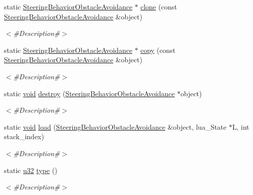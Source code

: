 \begin{DoxyCompactItemize}
static \mbox{\hyperlink{classnjli_1_1_steering_behavior_obstacle_avoidance}{Steering\+Behavior\+Obstacle\+Avoidance}} $\ast$ \mbox{\hyperlink{classnjli_1_1_steering_behavior_obstacle_avoidance_a6318f5b60c6217c7f40555436f452ffd}{clone}} (const \mbox{\hyperlink{classnjli_1_1_steering_behavior_obstacle_avoidance}{Steering\+Behavior\+Obstacle\+Avoidance}} \&object)
\begin{DoxyCompactList}\small\item\em $<$\#\+Description\#$>$ \end{DoxyCompactList}\item 
static \mbox{\hyperlink{classnjli_1_1_steering_behavior_obstacle_avoidance}{Steering\+Behavior\+Obstacle\+Avoidance}} $\ast$ \mbox{\hyperlink{classnjli_1_1_steering_behavior_obstacle_avoidance_a6b8a5f67dc84edfa9ebd0bbb82806155}{copy}} (const \mbox{\hyperlink{classnjli_1_1_steering_behavior_obstacle_avoidance}{Steering\+Behavior\+Obstacle\+Avoidance}} \&object)
\begin{DoxyCompactList}\small\item\em $<$\#\+Description\#$>$ \end{DoxyCompactList}\item 
static \mbox{\hyperlink{_thread_8h_af1e856da2e658414cb2456cb6f7ebc66}{void}} \mbox{\hyperlink{classnjli_1_1_steering_behavior_obstacle_avoidance_ac71d0e1386a71fec11787e0efc174f60}{destroy}} (\mbox{\hyperlink{classnjli_1_1_steering_behavior_obstacle_avoidance}{Steering\+Behavior\+Obstacle\+Avoidance}} $\ast$object)
\begin{DoxyCompactList}\small\item\em $<$\#\+Description\#$>$ \end{DoxyCompactList}\item 
static \mbox{\hyperlink{_thread_8h_af1e856da2e658414cb2456cb6f7ebc66}{void}} \mbox{\hyperlink{classnjli_1_1_steering_behavior_obstacle_avoidance_a00fc511232349f65efc748a71938e996}{load}} (\mbox{\hyperlink{classnjli_1_1_steering_behavior_obstacle_avoidance}{Steering\+Behavior\+Obstacle\+Avoidance}} \&object, lua\+\_\+\+State $\ast$L, int stack\+\_\+index)
\begin{DoxyCompactList}\small\item\em $<$\#\+Description\#$>$ \end{DoxyCompactList}\item 
static \mbox{\hyperlink{_util_8h_a10e94b422ef0c20dcdec20d31a1f5049}{u32}} \mbox{\hyperlink{classnjli_1_1_steering_behavior_obstacle_avoidance_ab5b0285af090b09dbc9e26105a4f7a31}{type}} ()
\begin{DoxyCompactList}\small\item\em $<$\#\+Description\#$>$ \end{DoxyCompactList}\end{DoxyCompactItemize}
